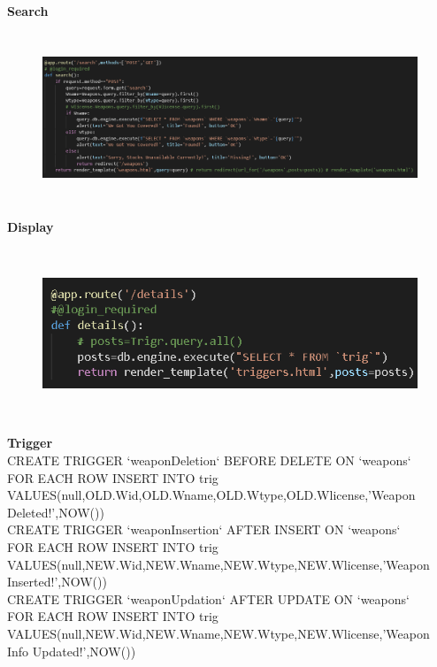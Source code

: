 \documentclass[12pt,a4paper]{report}
\begin{document}
\begin{flushleft}
\textbf{Search}\\
\end{flushleft}
\begin{figure}[hbtp]
\centering
\includegraphics[width=6in,height=2in]{../fig/Search}\\
\end{figure}
\begin{flushleft}
\textbf{Display}\\
\end{flushleft}
\begin{figure}[hbtp]
\centering
\includegraphics[width=6in,height=2in]{../fig/All}\\
\end{figure}
\newpage
\begin{flushleft}
\textbf{Trigger}\\
CREATE TRIGGER `weaponDeletion` BEFORE DELETE ON `weapons` \\FOR EACH ROW INSERT INTO trig VALUES(null,OLD.Wid,OLD.Wname,OLD.Wtype,OLD.Wlicense,'Weapon Deleted!',NOW())\\
CREATE TRIGGER `weaponInsertion` AFTER INSERT ON `weapons` \\FOR EACH ROW INSERT INTO trig
VALUES(null,NEW.Wid,NEW.Wname,NEW.Wtype,NEW.Wlicense,'Weapon Inserted!',NOW())\\
CREATE TRIGGER `weaponUpdation` AFTER UPDATE ON `weapons` \\FOR EACH ROW INSERT INTO trig 
VALUES(null,NEW.Wid,NEW.Wname,NEW.Wtype,NEW.Wlicense,'Weapon Info Updated!',NOW())\\
\end{flushleft}
\end{document}
